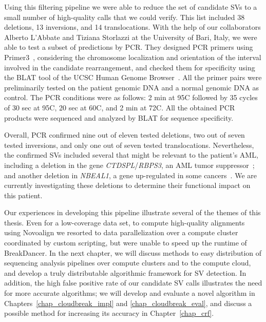 Using this filtering pipeline we were able to reduce the set of candidate SVs to a small number of high-quality calls that we could verify. This list included 38 deletions, 13 inversions, and 14 translocations. With the help of our collaborators Alberto L'Abbate and Tiziana Storlazzi at the University of Bari, Italy, we were able to test a subset of predictions by PCR. They designed PCR primers using Primer3~\cite{Untergasser01082012}, considering the chromosome localization and orientation of the interval involved in the candidate rearrangement, and checked them for specificity using the BLAT tool of the UCSC Human Genome Browser~\cite{Kent01042002}. All the primer pairs were preliminarily tested on the patient genomic DNA and a normal genomic DNA as control. The PCR conditions were as follows: 2 min at 95\degree C followed by 35 cycles of 30 sec at 95\degree C, 20 sec at 60\degree C, and 2 min at 72\degree C. All the obtained PCR products were sequenced and analyzed by BLAT for sequence specificity. 

Overall, PCR confirmed nine out of eleven tested deletions, two out of seven tested inversions, and only one out of seven tested translocations. Nevertheless, the confirmed SVs included several that might be relevant to the patient's AML, including a deletion in the gene \emph{CTDSPL}/\emph{RBPS3}, an AML tumor suppressor~\cite{Zheng:2012kk}; and another deletion in \emph{NBEAL1}, a gene up-regulated in some cancers~\cite{Chen:2004jo}. We are currently investigating these deletions to determine their functional impact on this patient. 

Our experiences in developing this pipeline illustrate several of the themes of this thesis. Even for a low-coverage data set, to compute high-quality alignments using Novoalign we resorted to data parallelization over a compute cluster coordinated by custom scripting, but were unable to speed up the runtime of BreakDancer. In the next chapter, we will discuss methods to easy distribution of sequencing analysis pipelines over compute clusters and to the compute cloud, and develop a truly distributable algorithmic framework for SV detection. In addition, the high false positive rate of our candidate SV calls illustrates the need for more accurate algorithms; we will develop and evaluate a novel algorithm in Chapters~\ref{chap_cloudbreak_impl} and \ref{chap_cloudbreak_eval}, and discuss a possible method for increasing its accuracy in Chapter~\ref{chap_crf}.